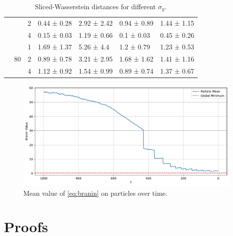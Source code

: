 \begin{table}[ht]
\begin{tabular}{lllllll}
         &  & 2 & 0.44 ± 0.28 & 2.92 ± 2.42 & 0.94 ± 0.89 & 1.44 ± 1.15 \\
         &  & 4 & 0.15 ± 0.03 & 1.19 ± 0.66 & 0.1 ± 0.03 & 0.45 ± 0.26 \\
        \cline{2-7}
         & \multirow[t]{3}{*}{80} & 1 & 1.69 ± 1.37 & 5.26 ± 4.4 & 1.2 ± 0.79 & 1.23 ± 0.53 \\
         &  & 2 & 0.89 ± 0.78 & 3.21 ± 2.95 & 1.68 ± 1.62 & 1.41 ± 1.16 \\
         &  & 4 & 1.12 ± 0.92 & 1.54 ± 0.99 & 0.89 ± 0.74 & 1.37 ± 0.67 \\
        \cline{1-7} \cline{2-7}
        \bottomrule
    \end{tabular}
    \caption{Sliced-Wasserstein distances for different $\sigma_y$.}
    \label{tab:gmm-sigma-split}
\end{table}

\begin{figure}[t]
    \centering
    \includegraphics[width=1\textwidth]{assets/smc_branin_mean_val.pdf}
    \caption{Mean value of \autoref{eq:branin} on particles over time.}
    \label{fig:branin-mean-val}
\end{figure}

\newpage

\section{Proofs}\label{sec:proofs}

